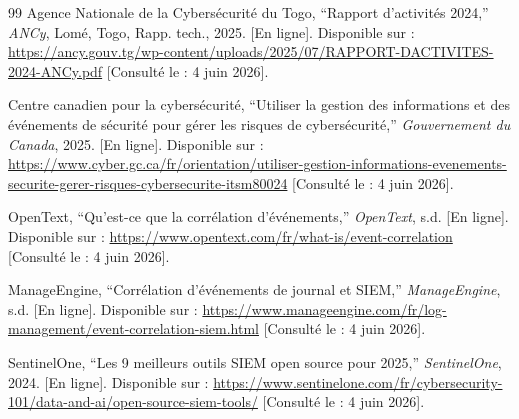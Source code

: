 \documentclass[a4paper,12pt]{article}
\begin{document}
\begin{thebibliography}{99}
Agence Nationale de la Cybersécurité du Togo,
``Rapport d'activités 2024,''
\textit{ANCy}, Lomé, Togo, Rapp. tech., 2025.
[En ligne]. Disponible sur :
\url{https://ancy.gouv.tg/wp-content/uploads/2025/07/RAPPORT-DACTIVITES-2024-ANCy.pdf}
[Consulté le : 4 juin 2026].

Centre canadien pour la cybersécurité,
``Utiliser la gestion des informations et des événements de sécurité pour gérer les risques de cybersécurité,''
\textit{Gouvernement du Canada}, 2025.
[En ligne]. Disponible sur :
\url{https://www.cyber.gc.ca/fr/orientation/utiliser-gestion-informations-evenements-securite-gerer-risques-cybersecurite-itsm80024}
[Consulté le : 4 juin 2026].

OpenText,
``Qu'est-ce que la corrélation d'événements,''
\textit{OpenText}, s.d.
[En ligne]. Disponible sur :
\url{https://www.opentext.com/fr/what-is/event-correlation}
[Consulté le : 4 juin 2026].

ManageEngine,
``Corrélation d'événements de journal et SIEM,''
\textit{ManageEngine}, s.d.
[En ligne]. Disponible sur :
\url{https://www.manageengine.com/fr/log-management/event-correlation-siem.html}
[Consulté le : 4 juin 2026].

SentinelOne,
``Les 9 meilleurs outils SIEM open source pour 2025,''
\textit{SentinelOne}, 2024.
[En ligne]. Disponible sur :
\url{https://www.sentinelone.com/fr/cybersecurity-101/data-and-ai/open-source-siem-tools/}
[Consulté le : 4 juin 2026].

\end{thebibliography}
\end{document}
